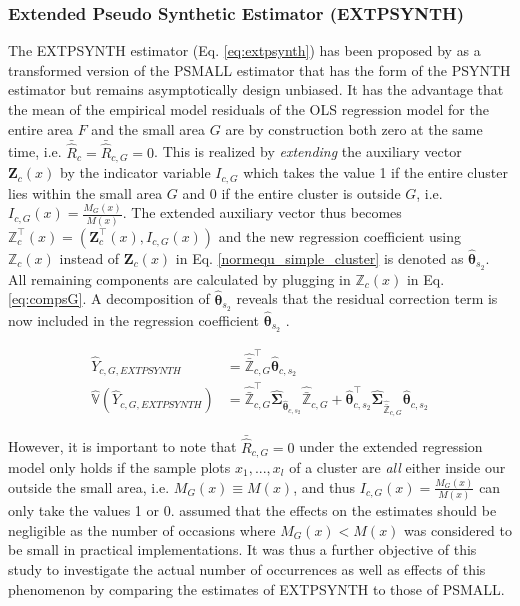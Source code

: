\documentclass[remotesensing,article,submit,moreauthors,pdftex,10pt,a4paper]{mdpi}
\newcommand{\psynth}{PSYNTH}
\newcommand{\psmall}{PSMALL}
\newcommand{\extpsynth}{EXTPSYNTH}
\newcommand{\var}{\mathbb{V}}
\begin{document}
\subsubsection{Extended Pseudo Synthetic Estimator (\extpsynth{})}
\label{sec:extpsynth}

The \extpsynth{} estimator (Eq. \ref{eq:extpsynth}) has been proposed by \citet{mandallaz2013a} as a transformed version of the \psmall{} estimator that has the form of the \psynth{} estimator but remains asymptotically design unbiased. It has the advantage that the mean of the empirical model residuals of the OLS regression model for the entire area $F$ and the small area $G$ are by construction both zero at the same time, i.e. $\bar{\hat{R}}_{c} = \bar{\hat{R}}_{c,G} = 0$. This is realized by \textit{extending} the auxiliary vector $\pmb{Z}_{c}(x)$ by the indicator variable $I_{c,G}$ which takes the value 1 if the entire cluster lies within the small area $G$ and 0 if the entire cluster is outside $G$, i.e. $I_{c,G}(x)=\frac{M_{G}(x)}{M(x)}$. The extended auxiliary vector thus becomes $\pmb{\mathbb{Z}}_{c}^{\top}(x)= (\pmb{Z}_{c}^{\top}(x),I_{c,G}(x))$ and the new regression coefficient using $\pmb{\mathbb{Z}}_{c}(x)$ instead of $\pmb{Z}_{c}(x)$ in Eq. \ref{normequ_simple_cluster} is denoted as $\hat{\pmb{\theta}}_{s_2}$. All remaining components are calculated by plugging in $\pmb{\mathbb{Z}}_{c}(x)$ in Eq. \ref{eq:compsG}. A decomposition of $\hat{\pmb{\theta}}_{s_2}$ reveals that the residual correction term is now included in the regression coefficient $\hat{\pmb{\theta}}_{s_2}$ \citep{mandallaz2016}.

\begin{subequations}\label{eq:extpsynth}
	\begin{align}
	\hat{Y}_{c,G,EXTPSYNTH} & =\hat{\bar{\pmb{\mathbb{Z}}}}_{c,G}^{\top}\hat{\pmb{\theta}}_{c,s_2} \label{eq:extpsynth_pest} \\
	\hat{\var}(\hat{Y}_{c,G,EXTPSYNTH})& =
	\hat{\bar{\pmb{\mathbb{Z}}}}_{c,G}^{\top}\hat{\pmb{\Sigma}}_{\hat{\pmb{\theta}}_{c,s_2}}
	\hat{\bar{\pmb{\mathbb{Z}}}}_{c,G}
	+ \hat{\pmb{\theta}}^{\top}_{c,s_2}\hat{\pmb{\Sigma}}_{\hat{\bar{\pmb{\mathbb{Z}}}}_{c,G}}\hat{\pmb{\theta}}_{c,s_2} \label{eq:extpsynth_var}
	\end{align}
\end{subequations}

However, it is important to note that $\bar{\hat{R}}_{c,G} = 0$ under the extended regression model only holds if the sample plots $x_1, ..., x_l$ of a cluster are \textit{all} either inside our outside the small area, i.e. $M_G(x)\equiv M(x)$, and thus $I_{c,G}(x)=\frac{M_{G}(x)}{M(x)}$ can only take the values 1 or 0. \citet{mandallaz2016} assumed that the effects on the estimates should be negligible as the number of occasions where $M_{G}(x) < M(x)$ was considered to be small in practical implementations. It was thus a further objective of this study to investigate the actual number of occurrences as well as effects of this phenomenon by comparing the estimates of \extpsynth{} to those of \psmall{}. %
\end{document}
